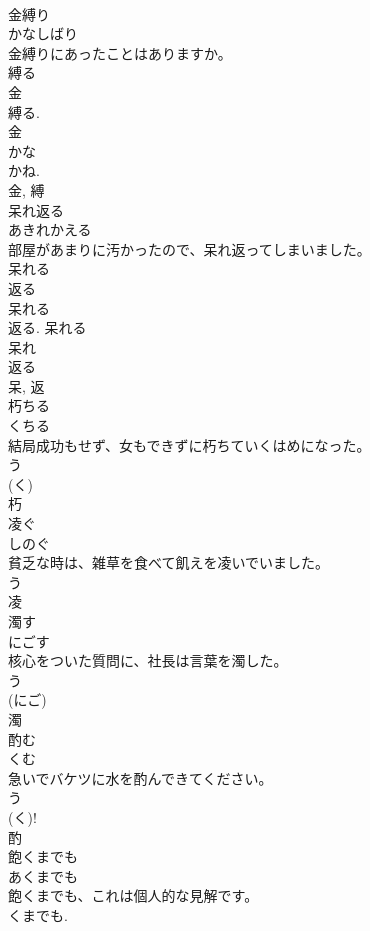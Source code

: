 \documentclass[8pt]{extreport}
\begin{document}
\begin{CJK}{UTF8}{min}
\\	金縛り	
\\	かなしばり	
\\	金縛りにあったことはありますか。	
\\	縛る 
\\	金 
\\	縛る. 
\\	金 
\\	かな 
\\	かね. 
\\	金, 縛	
\\	呆れ返る	
\\	あきれかえる	
\\	部屋があまりに汚かったので、呆れ返ってしまいました。	
\\	呆れる 
\\	返る 
\\	呆れる 
\\	返る. 呆れる 
\\	呆れ 
\\	返る 
\\	呆, 返	
\\	朽ちる	
\\	くちる	
\\	結局成功もせず、女もできずに朽ちていくはめになった。	
\\	う 
\\	(く) 
\\	朽	
\\	凌ぐ	
\\	しのぐ	
\\	貧乏な時は、雑草を食べて飢えを凌いでいました。	
\\	う 
\\	凌	
\\	濁す	
\\	にごす	
\\	核心をついた質問に、社長は言葉を濁した。	
\\	う 
\\	(にご) 
\\	濁	
\\	酌む	
\\	くむ	
\\	急いでバケツに水を酌んできてください。	
\\	う 
\\	(く)! 
\\	酌	
\\	飽くまでも	
\\	あくまでも	
\\	飽くまでも、これは個人的な見解です。	
\\	くまでも. 

\end{CJK}
\end{document}
